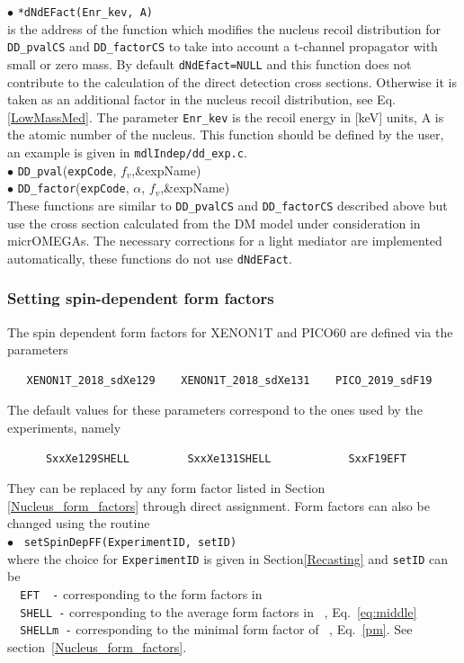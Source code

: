 \documentclass[12pt,a4paper]{article}
\begin{document}
\noindent
$\bullet$ \verb|*dNdEFact(Enr_kev, A)|\\
is the address of the function which modifies the nucleus recoil distribution  for {\tt DD\_pvalCS}
and {\tt DD\_factorCS}   to take into account a 
t-channel propagator  with  small or zero mass.  By default \verb|dNdEfact=NULL| and this 
function does not contribute to  the calculation of the direct detection cross sections. Otherwise  it is taken as an additional factor 
in the nucleus recoil distribution, see Eq.\ref{LowMassMed}.  
The parameter {\tt Enr\_kev} is the recoil energy in [keV] units, A is the  atomic number of the nucleus. This function should be defined by the user, an example is given in 
\verb|mdlIndep/dd_exp.c|.\\

\noindent
$\bullet$ \verb|DD_pval|(\verb|expCode|, $f_v$,\&expName)\\
$\bullet$  \verb|DD_factor|(\verb|expCode|, $\alpha$, $f_v$,\&expName)\\     
These functions are similar to  \verb|DD_pvalCS| and \verb|DD_factorCS| described above but use the  cross section calculated from the DM model under consideration in 
micrOMEGAs.  The necessary corrections for a light mediator are implemented automatically, these functions do not use {\tt dNdEFact}. \\



\subsubsection{Setting spin-dependent form factors}  
\label{SDmin}

The spin dependent form factors for XENON1T and PICO60  are defined via the parameters 
\begin{verbatim}
   XENON1T_2018_sdXe129    XENON1T_2018_sdXe131    PICO_2019_sdF19
\end{verbatim}
The default values for these parameters correspond to the ones used by the experiments, namely   
\begin{verbatim}
      SxxXe129SHELL         SxxXe131SHELL            SxxF19EFT  
\end{verbatim}
They can be replaced by any form factor listed  in Section \ref{Nucleus_form_factors} through direct
assignment. Form factors can also be changed using the routine  \\
\noindent
$\bullet$ \verb| setSpinDepFF(ExperimentID, setID)|\\
where the choice for \verb|ExperimentID| is given in Section\ref{Recasting} 
and \verb|setID| can be \\
 \verb|  EFT  -|  corresponding to  the form factors in ~\cite{Fitzpatrick:2012ix}\\
  \verb|  SHELL -|  corresponding to  the average form factors in ~\cite{Klos:2013rwa}, Eq.~\ref{eq:middle}\\
  \verb|  SHELLm -|  corresponding to the  minimal form factor of  ~\cite{Klos:2013rwa}, Eq.~\ref{pm}.  See section~\ref{Nucleus_form_factors}.
\end{document}
